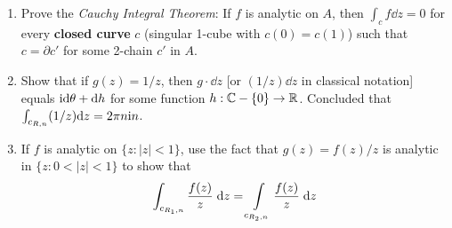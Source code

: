 \begin{problems}
{\begin{enumerate}[label=(\alph*)]
                and 
                \begin{align*}
                    \dd z = \dd x + \R{i}\dd y
                \end{align*}

                Show that $\dd(f\cdot\dd z)=0$ if and only if $f$ satisfy the Cauchy-Riemann equations.
            \item Prove the \textit{Cauchy Integral Theorem}: If $f$ is analytic on $A$,
                then $\int_c f \dd z = 0$ for every \textbf{closed curve} $c$ (singular 1-cube with
                $c(0) = c(1)$) such that $c = \partial c'$ for some 2-chain $c'$ in $A$.
            \item Show that if $g(z)=1/z$, then $g\cdot\dd z$ [or $(1/z)\dd z$ in classical notation]
                equals $\mathrm{i}\mathrm{d}\theta + \mathrm{d} h$ for some function $h:\mathbb{C}-\{0\}\to\mathbb{R}$. Concluded
                that $\int_{c_{R,n}}(1/z)\mathrm{d} z = 2\pi n \mathrm{i}n$.
            \item If $f$ is analytic on $\{z: |z| < 1\}$, use the fact that $g(z)=f(z)/z$ is 
                analytic in $\{z: 0 < |z| < 1\}$ to show that
                \begin{align*}
                    \int_{c_{R_1,n}}\frac{f(z)}z\;\dd z=\intop_{c_{R_2,n}}\frac{f(z)}z\;\dd z
                \end{align*}


\end{enumerate}}
\end{problems}

